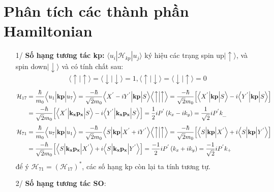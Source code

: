\section{Phân tích các thành phần Hamiltonian}
\begin{enumerate}
\item[1/]\textbf{Số hạng tương tác kp:} $\langle u_i|\mathcal{H}_{kp}|u_j\rangle$
ký hiệu các trạng spin up$| \uparrow\rangle$, và spin down$|\downarrow\rangle$ và có tính chất sau:
\begin{align}
\langle \uparrow |\uparrow\rangle = \langle\downarrow |\downarrow\rangle =1,\langle \uparrow |\downarrow\rangle = \langle\downarrow |\uparrow\rangle =0
\end{align}
\begin{align*}
\mathcal{H}_{17}&=\frac{\hbar}{m_0}\Bigl\langle u_1\Bigl\vert \mathbf{kp}\Bigr\vert u_7\Bigr\rangle = \frac{-\hbar}{\sqrt{2}m_0}\Bigl\langle X^{'} -iY^{'}\Bigr\vert\mathbf{kp}\Bigl\vert S\Bigr\rangle \Bigl\langle\Bigl\uparrow \Bigl\vert \Bigr\uparrow\Bigr\rangle 
= \frac{-\hbar}{\sqrt{2}m_0}\Bigl[\Bigl\langle X^{'}\Bigl\vert \mathbf{kp}\Bigr\vert S\Bigr\rangle -i\Bigl\langle Y^{'}\Bigl\vert \mathbf{kp}\Bigr\vert S\Bigr\rangle\Bigr] \\
&=\frac{-\hbar}{\sqrt{2}m_0}\Bigl[\Bigl\langle X^{'}\Bigl\vert \mathbf{k_x p_x}\Bigr\vert S\Bigr\rangle -i\Bigl\langle Y^{'}\Bigl\vert \mathbf{k_x p_x}\Bigr\vert S\Bigr\rangle\Bigr]=\frac{1}{2}iP^{'}\left(k_x -ik_y\right)=\frac{1}{\sqrt{2}}iP^{'}k_{\_}
\end{align*}
\begin{align*}
\mathcal{H}_{71}&=\frac{\hbar}{m_0}\Bigl\langle u_7\Bigl\vert \mathbf{kp}\Bigr\vert u_1\Bigr\rangle  =
\frac{-\hbar}{\sqrt{2}m_0}\Bigl\langle S\Bigl\vert\mathbf{kp}\Bigr\vert X^{'} +iY^{'}\Bigr\rangle \Bigl\langle \Bigl\uparrow \Bigl\vert  \Bigr\uparrow
\Bigr\rangle =
\frac{-\hbar}{\sqrt{2}m_0}\Bigl[\Bigl\langle S\Bigl\vert \mathbf{kp}\Bigl\vert X^{'}\Bigr\rangle + i\Bigl\langle S\Bigl\vert \mathbf{kp}\Bigr\vert Y^{'}\Bigr\rangle\Bigr]\\
&=\frac{-\hbar}{\sqrt{2}m_0}\Bigl[\Bigl\langle S\Bigl\vert \mathbf{k_x p_x}\Bigr\vert X^{'}\Bigr \rangle +i\Bigl\langle S\Bigl\vert \mathbf{k_x p_x}\Bigr\vert Y^{'} \Bigr\rangle\Bigr]
=\frac{-1}{2}iP^{'}\left(k_x +ik_y\right)=\frac{-1}{\sqrt{2}}iP^{'}k_{+}
\end{align*}
để ý $\mathcal{H}_{71} = \left(\mathcal{H}_{17}\right)^*$, các số hạng kp còn lại ta tính tương tự.
\item[2/]\textbf{Số hạng tương tác SO}:\\

\end{enumerate}
